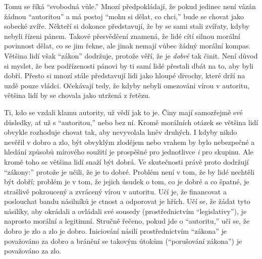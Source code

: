 \documentclass{book}
\begin{document}
Tomu se říká \enquote{svobodná vůle.} Mnozí předpokládají, že pokud jedinec není vázán žádnou \enquote{autoritou} a má postoj \enquote{mohu si dělat, co chci,} bude se chovat jako sobecké zvíře. Někteří si dokonce představují, že by se sami stali zvířaty, kdyby nebyli řízeni pánem. Takové přesvědčení znamená, že lidé cítí silnou morální povinnost dělat, co se jim řekne, ale jinak nemají vůbec žádný morální kompas. Většina lidí však \enquote{zákon} dodržuje, protože věří, že je \emph{dobré} tak činit. Není důvod si myslet, že bez podřízenosti pánovi by ti samí lidé přestali dbát na to, aby byli dobří. Přesto si mnozí stále představují lidi jako hloupé divochy, které drží na uzdě pouze vládci. Očekávají tedy, že kdyby nebyli omezováni vírou v autoritu, většina lidí by se chovala jako utržená z řetězu.

Ti, kdo se vzdali klamu autority, už vědí jak to je. Činy mají samozřejmě své důsledky, ať už s \enquote{autoritou,} nebo bez ní. Kromě morálních otázek se většina lidí obvykle rozhoduje chovat tak, aby nevyvolala hněv druhých. I kdyby nikdo nevěřil v dobro a zlo, být obvyklým zlodějem nebo vrahem by bylo nebezpečné a hledání způsobů mírového soužití je prospěšné pro jednotlivce \emph{i} pro skupinu. Ale kromě toho se většina lidí snaží být dobrá. Ve skutečnosti právě proto dodržují \enquote{zákony:} protože je učili, že je to dobré. Problém není v tom, že by lidé nechtěli být dobří; problém je v tom, že jejich úsudek o tom, co je dobré a co špatné, je strašlivě pokroucený a zvrácený vírou v autoritu. Učí je, že financovat a poslouchat bandu násilníků je ctnost a odporovat je hřích. Učí se, že žádat tyto násilíky, aby okrádali a ovládali své sousedy (prostřednictvím \enquote{legislativy}), je naprosto morální a legitimní. Stručně řečeno, pokud jde o \enquote{autoritu,} učí se, že dobro je zlo a zlo je dobro. Iniciování násilí prostřednictvím \enquote{zákona} je považováno za dobro a bránění se takovým útokům (\enquote{porušování zákona}) je považováno za zlo.
\end{document}
